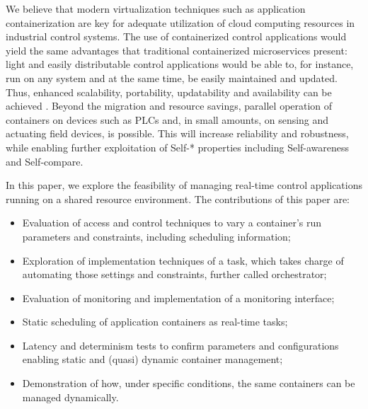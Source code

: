 \documentclass[]{scrartcl}
\begin{document}
We believe that modern virtualization techniques such as application containerization \cite{Mogaetal2016,Tascietal2018,GoldschmidtHauck-Stattelmann2016} are key for adequate utilization of cloud computing resources in industrial control systems.
The use of containerized control applications would yield the same advantages that traditional containerized microservices present: light and easily distributable control applications would be able to, for instance, run on any system and at the same time, be easily maintained and updated. 
Thus, enhanced scalability, portability, updatability and availability can be achieved \cite{Fazioetal2016}.
Beyond the migration and resource savings, parallel operation of containers on devices such as PLCs and, in small amounts, on sensing and actuating field devices, is possible. 
This will increase reliability and robustness, while enabling further exploitation of Self-* properties including Self-awareness and Self-compare.

In this paper, we explore the feasibility of managing real-time control applications running on a shared resource environment.
The contributions of this paper are: 
\begin{itemize}
	\item Evaluation of access and control techniques to vary a container's run parameters and constraints, including scheduling information;
	
	\item Exploration of implementation techniques of a task, which takes charge of automating those settings and constraints, further called orchestrator;
	
	\item Evaluation of monitoring and implementation of a monitoring interface;
	
	\item Static scheduling of application containers as real-time tasks;

	\item Latency and determinism tests to confirm parameters and configurations enabling static and (quasi) dynamic container management;
		
	\item Demonstration of how, under specific conditions, the same containers can be managed dynamically.
\end{itemize}
\end{document}
